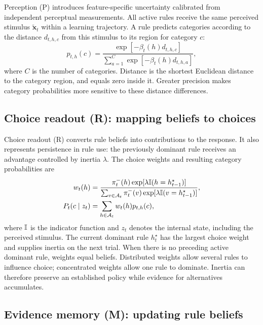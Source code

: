 Perception (P) introduces feature-specific uncertainty calibrated from independent perceptual measurements. All active rules receive the same perceived stimulus $\widetilde{\bm x}_t$ within a learning trajectory. A rule predicts categories according to the distance $d_{t,h,c}$ from this stimulus to its region for category $c$:
\begin{equation}
p_{t,h}(c)=
\frac{\exp[-\beta_t(h)d_{t,h,c}]}
{\sum_{a=1}^{C}\exp[-\beta_t(h)d_{t,h,a}]},
\label{eq:category-prediction}
\end{equation}
where $C$ is the number of categories. Distance is the shortest Euclidean distance to the category region, and equals zero inside it. Greater precision makes category probabilities more sensitive to these distance differences.

\subsection*{Choice readout (R): mapping beliefs to choices}
\label{m:choice}
Choice readout (R) converts rule beliefs into contributions to the response. It also represents persistence in rule use: the previously dominant rule receives an advantage controlled by inertia $\lambda$. The choice weights and resulting category probabilities are
\begin{align}
w_t(h)&=\frac{\pi_t^-(h)\exp[\lambda\mathbb I(h=h_{t-1}^{\star})]}
{\sum_{v\in\mathcal A_t}\pi_t^-(v)\exp[\lambda\mathbb I(v=h_{t-1}^{\star})]},
\label{eq:choice-weights}\\
P_t(c\mid z_t)&=\sum_{h\in\mathcal A_t}w_t(h)p_{t,h}(c),
\label{eq:choice-mixture}
\end{align}
where $\mathbb I$ is the indicator function and $z_t$ denotes the internal state, including the perceived stimulus. The current dominant rule $h_t^{\star}$ has the largest choice weight and supplies inertia on the next trial. When there is no preceding active dominant rule, weights equal beliefs. Distributed weights allow several rules to influence choice; concentrated weights allow one rule to dominate. Inertia can therefore preserve an established policy while evidence for alternatives accumulates.

\subsection*{Evidence memory (M): updating rule beliefs}
\label{m:memory}

